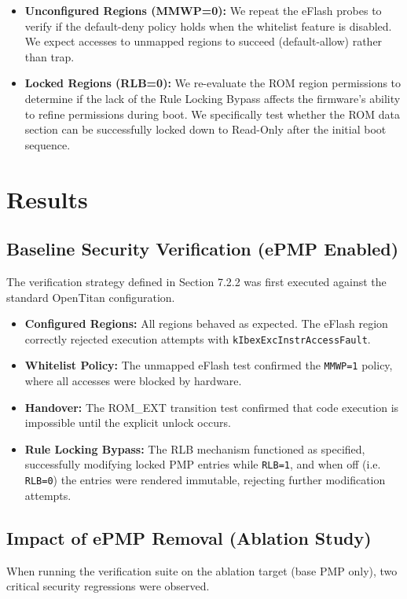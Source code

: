 \documentclass[10pt,a4paper,twocolumn,twoside]{article}
\begin{document}
\begin{itemize}
    \item \textbf{Unconfigured Regions (MMWP=0):} We repeat the eFlash probes to verify if the default-deny policy holds when the whitelist feature is disabled. We expect accesses to unmapped regions to succeed (default-allow) rather than trap.
    \item \textbf{Locked Regions (RLB=0):} We re-evaluate the ROM region permissions to determine if the lack of the Rule Locking Bypass affects the firmware's ability to refine permissions during boot. We specifically test whether the ROM data section can be successfully locked down to Read-Only after the initial boot sequence.
\end{itemize}

\section{Results}

\subsection{Baseline Security Verification (ePMP Enabled)}
The verification strategy defined in Section 7.2.2 was first executed against the standard OpenTitan configuration.
\begin{itemize}
    \item \textbf{Configured Regions:} All regions behaved as expected. The eFlash region correctly rejected execution attempts with \texttt{kIbexExcInstrAccessFault}.
    \item \textbf{Whitelist Policy:} The unmapped eFlash test confirmed the \texttt{MMWP=1} policy, where all accesses were blocked by hardware.
    \item \textbf{Handover:} The ROM\_EXT transition test confirmed that code execution is impossible until the explicit unlock occurs.
    \item \textbf{Rule Locking Bypass:} The RLB mechanism functioned as specified, successfully modifying locked PMP entries while \texttt{RLB=1}, and when off (i.e. \texttt{RLB=0}) the entries were rendered immutable, rejecting further modification attempts.
\end{itemize}


\subsection{Impact of ePMP Removal (Ablation Study)}
When running the verification suite on the ablation target (base PMP only), two critical security regressions were observed.
\end{document}
